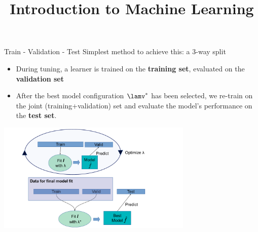 




\newcommand{\titlefigure}{figure_man/train_valid_test.pdf}
\newcommand{\learninggoals}{
\item Understand how to fulfill the untouched test set principle by a 3-way split of the data
\item Understand how thereby the tuning step can be seen as part of a more complex training procedure}

\title{Introduction to Machine Learning}
\date{}




\begin{vbframe}{Train - Validation - Test}
Simplest method to achieve this: a 3-way split
\begin{itemize}
\item During tuning, a learner is trained on the \textbf{training set},
  evaluated on the  \textbf{validation set}
\item After the best model configuration $\lams$ has been selected, we re-train on the joint (training+validation) set and evaluate the model's performance on the \textbf{test set}.
\end{itemize}
\begin{center}
\includegraphics[width=0.7\textwidth]{figure_man/train_valid_test.pdf}
\end{center}
\end{vbframe}


